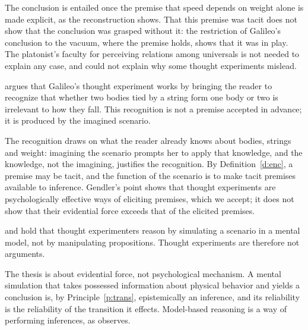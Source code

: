 \documentclass{situationist-preprint}
\begin{document}
\begin{reply}
The conclusion is entailed once the premise that speed depends on weight alone is made explicit, as the reconstruction shows. That this premise was tacit does not show that the conclusion was grasped without it: the restriction of Galileo's conclusion to the vacuum, where the premise holds, shows that it was in play. The platonist's faculty for perceiving relations among universals is not needed to explain any case, and could not explain why some thought experiments mislead.
\end{reply}

\begin{objection}
\citet{Gendler1998} argues that Galileo's thought experiment works by bringing the reader to recognize that whether two bodies tied by a string form one body or two is irrelevant to how they fall. This recognition is not a premise accepted in advance; it is produced by the imagined scenario.
\end{objection}

\begin{reply}
The recognition draws on what the reader already knows about bodies, strings and weight: imagining the scenario prompts her to apply that knowledge, and the knowledge, not the imagining, justifies the recognition. By Definition~\ref{d:enc}, a premise may be tacit, and the function of the scenario is to make tacit premises available to inference. Gendler's point shows that thought experiments are psychologically effective ways of eliciting premises, which we accept; it does not show that their evidential force exceeds that of the elicited premises.
\end{reply}

\begin{objection}
\citet{Nersessian1993} and \citet{Miscevic1992} hold that thought experimenters reason by simulating a scenario in a mental model, not by manipulating propositions. Thought experiments are therefore not arguments.
\end{objection}

\begin{reply}
The thesis is about evidential force, not psychological mechanism. A mental simulation that takes possessed information about physical behavior and yields a conclusion is, by Principle~\ref{p:trans}, epistemically an inference, and its reliability is the reliability of the transition it effects. Model-based reasoning is a way of performing inferences, as \citet{Norton2004} observes.
\end{reply}
\end{document}
